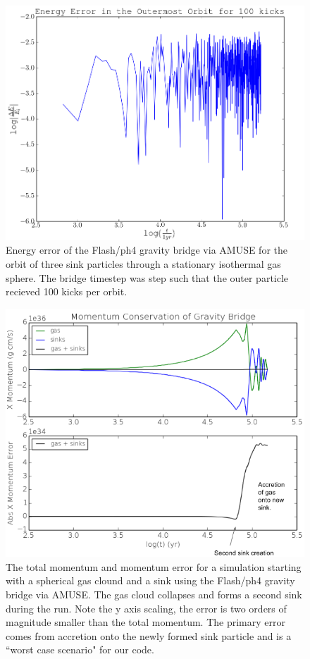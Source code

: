 \documentclass[11pt]{article}
\begin{document}
\begin{figure}
\centering
\includegraphics[width=0.75\linewidth]{ener_mod}
\caption{\small Energy error of the Flash/ph4 gravity bridge via AMUSE for the orbit of three sink particles through a stationary isothermal gas sphere. The bridge timestep was step such that the outer particle recieved 100 kicks per orbit.}
\label{fig:ener}
\end{figure}

\begin{figure}
\hspace{-1.0cm}
\centering
\includegraphics[width=0.75\linewidth]{mom_mod}
\caption{\small The total momentum and momentum error for a simulation starting with a spherical gas clound and a sink using the Flash/ph4 gravity bridge via AMUSE. The gas cloud collapses and forms a second sink during the run. Note the y axis scaling, the error is two orders of magnitude smaller than the total momentum. The primary error comes from accretion onto the newly formed sink particle and is a ``worst case scenario" for our code.}
\label{fig:mommod}
\end{figure}
\end{document}
